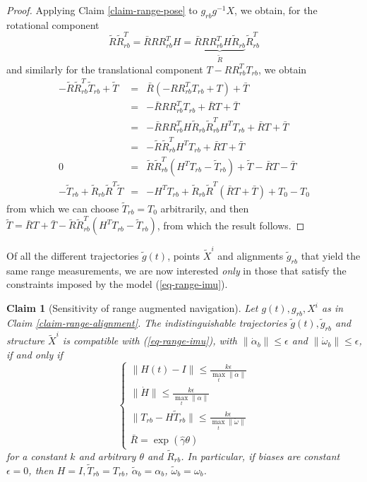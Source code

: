 \documentclass[]{article}
\newcommand{\bc}{\begin{cases}}
\newcommand{\ec}{\end{cases}}
\def\w{\omega}
\newtheorem{claim}{Claim}
\def\gw{\tilde{g}}
\def\Xw{\tilde{X}}
\begin{document}
\begin{proof}
Applying Claim \ref{claim-range-pose} to $g_{rb}g^{-1} X$, we obtain, for the rotational component
\begin{equation}\tilde R \tilde R_{rb}^T = \bar R R  R_{rb}^TH = 
\underbrace{\bar R R R_{rb}^T H \tilde R_{rb}}_{\tilde R}\tilde R_{rb}^T
\end{equation}
and similarly for the translational component $T - R R_{rb}^T T_{rb}$, we obtain
\begin{eqnarray}
-\tilde R \tilde R_{rb}^T \tilde T_{rb} + \tilde T &=& \bar R(-R R_{rb}^T T_{rb} + T) + \bar T \\
&=& - \bar R R R_{rb}^T T_{rb} + \bar R T + \bar T \\
&=& - \bar R R R_{rb}^T H \tilde R_{rb}\tilde R_{rb}^T H^T T_{rb}+ \bar R T + \bar T \\
&=& - \tilde R \tilde R_{rb}^T H^T T_{rb} + \bar R T + \bar T \\
0 &=& \tilde R \tilde R_{rb}^T(H^T T_{rb} - \tilde T_{rb}) + \tilde T - \bar R T - \bar T \\
-\tilde T_{rb} + \tilde R_{rb}\tilde R^T \tilde T &=& -H^T T_{rb} + \tilde R_{rb} \tilde R^T(\bar R T + \bar T) + T_0 - T_0
\end{eqnarray}
from which we can choose $\tilde T_{rb} = T_0$ arbitrarily, and then $\tilde T = \bar R T + \bar T - \tilde R \tilde R^T_{rb}(H^T T_{rb} - \tilde T_{rb})$, from which the result follows.
\end{proof}
Of all the different trajectories $\gw(t)$, points $\Xw^i$ and alignments $\gw_{rb}$ that yield the same range measurements, we are now interested {\em only} in those that satisfy the constraints imposed by the model (\ref{eq-range-imu}).
\begin{claim}[Sensitivity of range augmented navigation]
Let $g(t), g_{rb}, X^i$ as in Claim \ref{claim-range-alignment}. The indistinguishable trajectories $\gw(t), \gw_{rb}$ and structure $\Xw^i$ is compatible with (\ref{eq-range-imu}), with $\| \dot \alpha_b \| \le \epsilon$ and $\| \dot \w_b \| \le \epsilon$, if and only if
\begin{equation}
\bc
\| H(t) - I \| \le \frac{k \epsilon}{\max_t \| \dot \alpha \|} \\
\| \dot H \| \le \frac{k\epsilon}{\max_t \| \alpha \|} \\
\| T_{rb} - H \tilde T_{rb} \| \le \frac{k \epsilon}{\max_t \| \ddot \w \|} \\
\bar R = \exp(\widehat \gamma \theta)
\ec
\end{equation}
for a constant $k$ and arbitrary $\theta$ and $\tilde R_{rb}$. In particular, if biases are constant $\epsilon = 0$, then $H = I, \tilde T_{rb} = T_{rb}$,  $\tilde \alpha_b = \alpha_b$, $\tilde \w_b  = \w_b$.
\end{claim}
\end{document}
